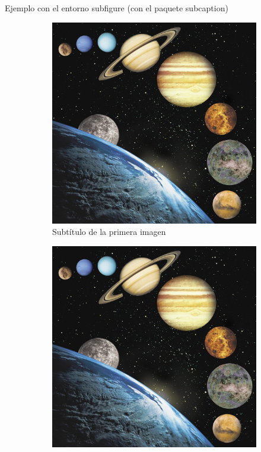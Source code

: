 \documentclass[aspectratio=169, 10pt]{beamer}
\begin{document}
\begin{frame}{Ejemplo con el entorno subfigure (con el paquete subcaption)}
    \begin{figure}[H]
    \centering
    \begin{subfigure}{0.45\textwidth} %
        \centering
        \includegraphics[scale=0.05]{astronomia.jpg} 
        \caption{Subtítulo de la primera imagen}
        \label{fig:sub1}
    \end{subfigure}
    \hfill
    \begin{subfigure}{0.45\textwidth}
        \centering
        \includegraphics[scale=0.05]{astronomia.jpg} 

\end{subfigure}
\end{figure}
\end{frame}
\end{document}
